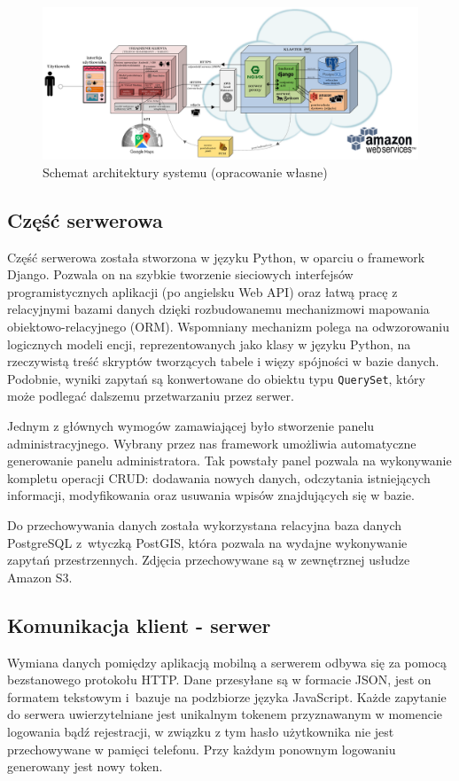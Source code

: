 \documentclass[licencjacka]{pracamgr}
\begin{document}
\newpage
\begin{figure}[H]
  \centering
  \includegraphics[angle=90, width=\textwidth,height=\textheight, keepaspectratio]{architekturakolor.png}
  \caption{Schemat architektury systemu (opracowanie własne)}
\end{figure}

\subsection{Część serwerowa}

Część serwerowa została stworzona w języku Python, w oparciu o framework Django. Pozwala on na szybkie tworzenie sieciowych interfejsów programistycznych aplikacji (po angielsku Web API) oraz łatwą pracę z relacyjnymi bazami danych dzięki rozbudowanemu mechanizmowi mapowania obiektowo-relacyjnego (ORM). Wspomniany mechanizm polega na odwzorowaniu logicznych modeli encji, reprezentowanych jako klasy w języku Python, na rzeczywistą treść skryptów tworzących tabele i więzy spójności w bazie danych. Podobnie, wyniki zapytań są konwertowane do obiektu typu \texttt{QuerySet}, który może podlegać dalszemu przetwarzaniu przez serwer.

Jednym z głównych wymogów zamawiającej było stworzenie panelu administracyjnego. Wybrany przez nas framework umożliwia automatyczne generowanie panelu administratora. Tak powstały panel pozwala na wykonywanie kompletu operacji CRUD: dodawania nowych danych, odczytania istniejących informacji, modyfikowania oraz usuwania wpisów znajdujących się w bazie.

Do przechowywania danych została wykorzystana relacyjna baza danych PostgreSQL z~wtyczką PostGIS, która pozwala na wydajne wykonywanie zapytań przestrzennych. Zdjęcia przechowywane są w zewnętrznej usłudze Amazon S3.

\subsection{Komunikacja klient - serwer}
Wymiana danych pomiędzy aplikacją mobilną a serwerem odbywa się za pomocą bezstanowego protokołu HTTP. Dane przesyłane są w formacie JSON, jest on formatem tekstowym i~bazuje na podzbiorze języka JavaScript. Każde zapytanie do serwera uwierzytelniane jest unikalnym tokenem przyznawanym w momencie logowania bądź rejestracji, w związku z tym hasło użytkownika nie jest przechowywane w pamięci telefonu. Przy każdym ponownym logowaniu generowany jest nowy token.
\end{document}
